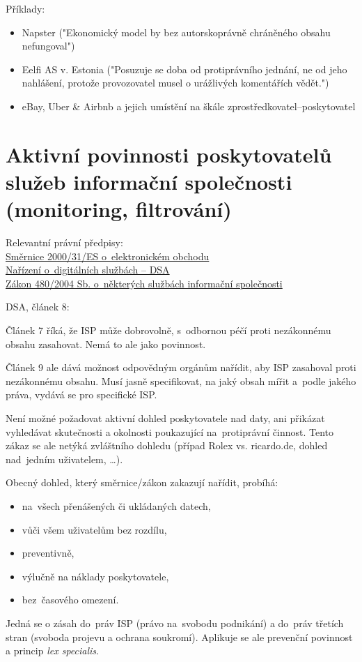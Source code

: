 Příklady:
\begin{itemize}
    \item Napster ("Ekonomický model by bez autorskoprávně chráněného obsahu nefungoval")
    \item Eelfi AS v. Estonia ("Posuzuje se doba od protiprávního jednání, ne od jeho nahlášení, protože provozovatel musel o urážlivých komentářích vědět.")
    \item eBay, Uber \& Airbnb a jejich umístění na škále zprostředkovatel--poskytovatel
\end{itemize}



\clearpage
\section{Aktivní povinnosti poskytovatelů služeb informační společnosti (monitoring, filtrování)}

{}Relevantní právní předpisy:
\\\href{https://eur-lex.europa.eu/legal-content/CS/TXT/?uri=CELEX%
}{Směrnice 2000/31/ES o~elektronickém obchodu}
\\\href{https://eur-lex.europa.eu/legal-content/CS/TXT/?uri=celex%3A32022R2065}{Nařízení o~digitálních službách -- DSA}
\\\href{https://www.zakonyprolidi.cz/cs/2004-480}{Zákon 480/2004 Sb. o~některých službách informační společnosti}

DSA, článek 8: 

Článek 7 říká, že ISP může dobrovolně, s~odbornou péčí proti nezákonnému obsahu zasahovat. Nemá to ale jako povinnost.

Článek 9 ale dává možnost odpovědným orgánům nařídit, aby ISP zasahoval proti nezákonnému obsahu. Musí jasně specifikovat, na jaký obsah mířit a~podle jakého práva, vydává se pro specifické ISP.

Není možné požadovat aktivní dohled poskytovatele nad daty, ani přikázat vyhledávat skutečnosti a okolnosti poukazující na~protiprávní činnost.
Tento zákaz se ale netýká zvláštního dohledu (případ Rolex vs. ricardo.de, dohled nad~jedním uživatelem, \dots).

Obecný dohled, který směrnice/zákon zakazují nařídit, probíhá:
\begin{itemize}
    \item na~všech přenášených či ukládaných datech,
    \item vůči všem uživatelům bez rozdílu,
    \item preventivně,
    \item výlučně na náklady poskytovatele,
    \item bez~časového omezení.
\end{itemize}
Jedná se o zásah do~práv ISP (právo na~svobodu podnikání) a do~práv třetích stran (svoboda projevu a ochrana soukromí).
Aplikuje se ale prevenční povinnost a princip \emph{lex specialis}.

